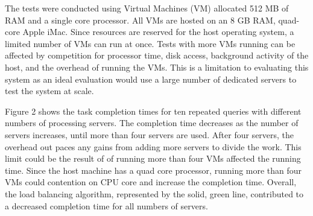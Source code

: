 \documentclass{article}
\newenvironment{Figure}
               {\par\medskip\noindent\minipage{\linewidth}}
               {\endminipage\par\medskip}
\begin{document}
\begin{multicols}{2}
\begin{Figure}
   \centering
\noindent{}
\end{Figure}


The tests were conducted using Virtual Machines (VM) allocated 512 MB of RAM and a single core processor. All VMs are hosted on an 8 GB RAM, quad-core Apple iMac. Since resources are reserved for the host operating system, a limited number of VMs can run at once.  Tests with more VMs running can be affected by competition for processor time, disk access, background activity of the host, and the overhead of running the VMs.  This is a limitation to evaluating this system as an ideal evaluation would use a large number of dedicated servers to test the system at scale.

Figure 2 shows the task completion times for ten repeated queries with different numbers of processing servers.  The completion time decreases as the number of servers increases, until more than four servers are used.  After four servers, the overhead out paces any gains from adding more servers to divide the work.  This limit could be the result of of running more than four VMs affected the running time.  Since the host machine has a quad core processor, running more than four VMs could contention on CPU core and increase the completion time. Overall, the load balancing algorithm, represented by the solid, green line, contributed to a decreased completion time for all numbers of servers.


\end{multicols}
\end{document}
